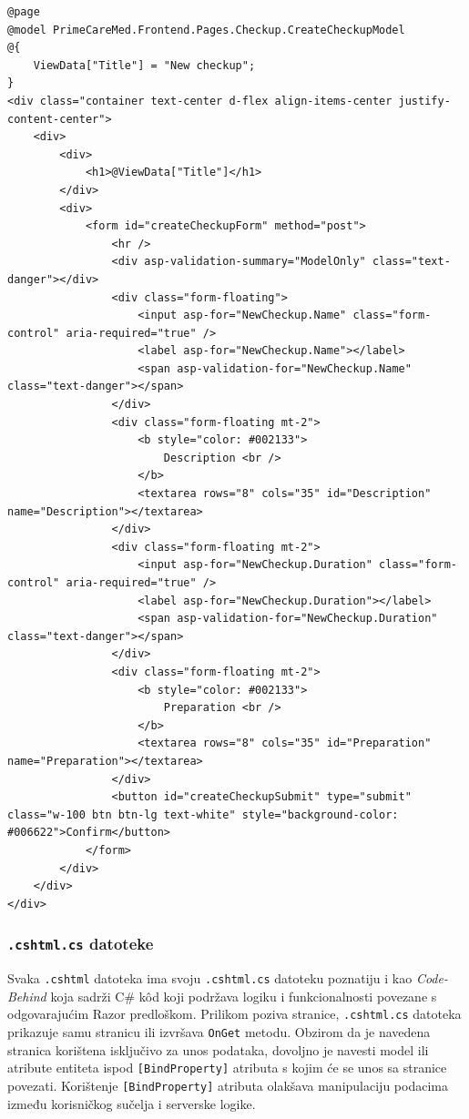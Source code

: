 \begin{lstlisting}[caption={\texttt{CreateCheckup.cshtml} datoteka}, label=createCheckupHtml]
@page
@model PrimeCareMed.Frontend.Pages.Checkup.CreateCheckupModel
@{
    ViewData["Title"] = "New checkup";
}
<div class="container text-center d-flex align-items-center justify-content-center">
    <div>
        <div>
            <h1>@ViewData["Title"]</h1>
        </div>
        <div>
            <form id="createCheckupForm" method="post">
                <hr />
                <div asp-validation-summary="ModelOnly" class="text-danger"></div>
                <div class="form-floating">
                    <input asp-for="NewCheckup.Name" class="form-control" aria-required="true" />
                    <label asp-for="NewCheckup.Name"></label>
                    <span asp-validation-for="NewCheckup.Name" class="text-danger"></span>
                </div>
                <div class="form-floating mt-2">
                    <b style="color: #002133">
                        Description <br />
                    </b>
                    <textarea rows="8" cols="35" id="Description" name="Description"></textarea>
                </div>
                <div class="form-floating mt-2">
                    <input asp-for="NewCheckup.Duration" class="form-control" aria-required="true" />
                    <label asp-for="NewCheckup.Duration"></label>
                    <span asp-validation-for="NewCheckup.Duration" class="text-danger"></span>
                </div>
                <div class="form-floating mt-2">
                    <b style="color: #002133">
                        Preparation <br />
                    </b>
                    <textarea rows="8" cols="35" id="Preparation" name="Preparation"></textarea>
                </div>
                <button id="createCheckupSubmit" type="submit" class="w-100 btn btn-lg text-white" style="background-color: #006622">Confirm</button>
            </form>
        </div>
    </div>
</div>
\end{lstlisting}

\subsubsection{\texttt{.cshtml.cs} datoteke}
\label{subsubsec:.cshtml.cs}
Svaka \texttt{.cshtml} datoteka ima svoju \texttt{.cshtml.cs} datoteku poznatiju i kao \textit{Code-Behind} koja sadrži C\# k\^od koji podržava logiku i funkcionalnosti povezane s odgovarajućim Razor predloškom. Prilikom poziva stranice, \texttt{.cshtml.cs} datoteka prikazuje samu stranicu ili izvršava \texttt{OnGet} metodu. Obzirom da je navedena stranica korištena isključivo za unos podataka, dovoljno je navesti model ili atribute entiteta ispod \texttt{[BindProperty]} atributa s kojim će se unos sa stranice povezati. Korištenje \texttt{[BindProperty]} atributa olakšava manipulaciju podacima između korisničkog sučelja i serverske logike.

